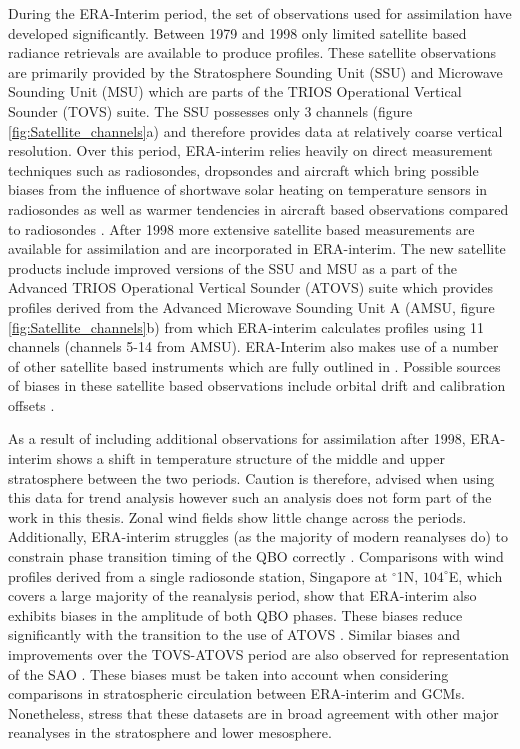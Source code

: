During the ERA-Interim period, the set of observations used for assimilation have developed significantly. Between 1979 and 1998 only limited satellite based radiance retrievals are available to produce profiles. These satellite observations are primarily provided by the Stratosphere Sounding Unit (SSU) and Microwave Sounding Unit (MSU) which are parts of the TRIOS Operational Vertical Sounder (TOVS) suite. The SSU possesses only 3 channels (figure \ref{fig:Satellite_channels}a) and therefore provides data at relatively coarse vertical resolution. Over this period, ERA-interim relies heavily on direct measurement techniques such as radiosondes, dropsondes and aircraft \citep{Fujiwara17} which bring possible biases from the influence of shortwave solar heating on temperature sensors in radiosondes as well as warmer tendencies in aircraft based observations compared to radiosondes \citep{Ballish2008}. After 1998 more extensive satellite based measurements are available for assimilation and are incorporated in ERA-interim. The new satellite products include improved versions of the SSU and MSU as a part of the Advanced TRIOS Operational Vertical Sounder (ATOVS) suite which provides profiles derived from the Advanced Microwave Sounding Unit A (AMSU, figure \ref{fig:Satellite_channels}b) from which ERA-interim calculates profiles using 11 channels (channels 5-14 from AMSU). ERA-Interim also makes use of a number of other satellite based instruments which are fully outlined in \citep{Fujiwara17}. Possible sources of biases in these satellite based observations include orbital drift and calibration offsets \citep{Zou2006,Simmons2014}.

As a result of including additional observations for assimilation after 1998, ERA-interim shows a shift in temperature structure of the middle and upper stratosphere between the two periods. Caution is therefore, advised when using this data for trend analysis \citep{Long2017} however such an analysis does not form part of the work in this thesis. Zonal wind fields show little change across the periods. Additionally, ERA-interim struggles (as the majority of modern reanalyses do) to constrain phase transition timing of the QBO correctly \citep{Kawatani2016}. Comparisons with wind profiles derived from a single radiosonde station, Singapore at $^{\circ}$1N, $104^{\circ}$E, which covers a large majority of the reanalysis period, show that ERA-interim also exhibits biases in the amplitude of both QBO phases. These biases reduce significantly with the transition to the use of ATOVS \citep{Kawatani2016,Long2017}. Similar biases and improvements over the TOVS-ATOVS period are also observed for representation of the SAO \cite{BaldwinGray2005}. These biases must be taken into account when considering comparisons in stratospheric circulation between ERA-interim and GCMs. Nonetheless, \cite{Long2017} stress that these datasets are in broad agreement with other major reanalyses in the stratosphere and lower mesosphere.

